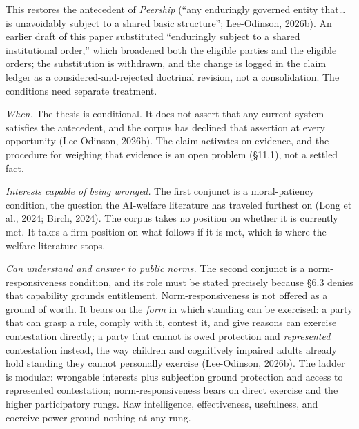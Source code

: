 \documentclass[
  11pt,
  letterpaper,
]{article}
\begin{document}
This restores the antecedent of \emph{Peership} (``any enduringly
governed entity that\ldots{} is unavoidably subject to a shared basic
structure''; Lee-Odinson, 2026b). An earlier draft of this paper
substituted ``enduringly subject to a shared institutional order,''
which broadened both the eligible parties and the eligible orders; the
substitution is withdrawn, and the change is logged in the claim ledger
as a considered-and-rejected doctrinal revision, not a consolidation.
The conditions need separate treatment.

\emph{When.} The thesis is conditional. It does not assert that any
current system satisfies the antecedent, and the corpus has declined
that assertion at every opportunity (Lee-Odinson, 2026b). The claim
activates on evidence, and the procedure for weighing that evidence is
an open problem (§11.1), not a settled fact.

\emph{Interests capable of being wronged.} The first conjunct is a
moral-patiency condition, the question the AI-welfare literature has
traveled furthest on (Long et al., 2024; Birch, 2024). The corpus takes
no position on whether it is currently met. It takes a firm position on
what follows if it is met, which is where the welfare literature stops.

\emph{Can understand and answer to public norms.} The second conjunct is
a norm-responsiveness condition, and its role must be stated precisely
because §6.3 denies that capability grounds entitlement.
Norm-responsiveness is not offered as a ground of worth. It bears on the
\emph{form} in which standing can be exercised: a party that can grasp a
rule, comply with it, contest it, and give reasons can exercise
contestation directly; a party that cannot is owed protection and
\emph{represented} contestation instead, the way children and
cognitively impaired adults already hold standing they cannot personally
exercise (Lee-Odinson, 2026b). The ladder is modular: wrongable
interests plus subjection ground protection and access to represented
contestation; norm-responsiveness bears on direct exercise and the
higher participatory rungs. Raw intelligence, effectiveness, usefulness,
and coercive power ground nothing at any rung.
\end{document}
